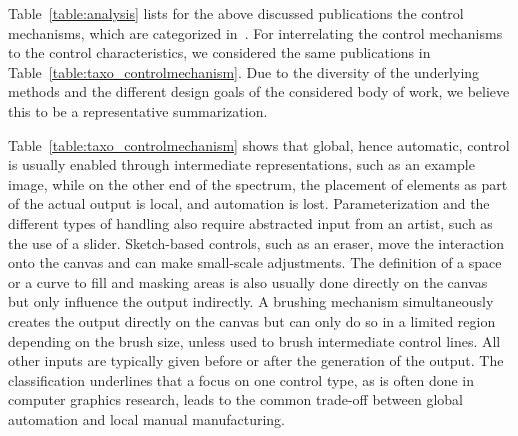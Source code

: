 Table~\ref{table:analysis} lists for the above discussed publications the control mechanisms, which are categorized in~. For interrelating the control mechanisms to the control characteristics, we considered the same publications in Table~\ref{table:taxo_controlmechanism}. Due to the diversity of the underlying methods and the different design goals of the considered body of work, we believe this to be a representative summarization.

Table~\ref{table:taxo_controlmechanism} shows that global, hence automatic, control is usually enabled through intermediate representations, such as an example image, while on the other end of the spectrum, the placement of elements as part of the actual output is local, and automation is lost. Parameterization and the different types of handling also require abstracted input from an artist, such as the use of a slider. Sketch-based controls, such as an eraser, move the interaction onto the canvas and can make small-scale adjustments. The definition of a space or a curve to fill and masking areas is also usually done directly on the canvas but only influence the output indirectly. A brushing mechanism simultaneously creates the output directly on the canvas but can only do so in a limited region depending on the brush size, unless used to brush intermediate control lines. All other inputs are typically given before or after the generation of the output. The classification underlines that a focus on one control type, as is often done in computer graphics research, leads to the common trade-off between global automation and local manual manufacturing.


